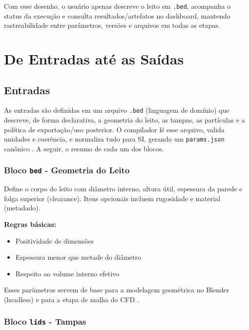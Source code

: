Com esse desenho, o usuário apenas descreve o leito em \texttt{.bed}, acompanha o status da execução e consulta resultados/artefatos no dashboard, mantendo rastreabilidade entre parâmetros, versões e arquivos em todas as etapas.

\section{De Entradas até as Saídas}

\subsection{Entradas}

As entradas são definidas em um arquivo \texttt{.bed} (linguagem de domínio) que descreve, de forma declarativa, a geometria do leito, as tampas, as partículas e a política de exportação/uso posterior. O compilador lê esse arquivo, valida unidades e coerência, e normaliza tudo para SI, gerando um \texttt{params.json} canônico \cite{fowler2010}. A seguir, o resumo de cada um dos blocos.

\subsubsection{Bloco \texttt{bed} - Geometria do Leito}

Define o corpo do leito com diâmetro interno, altura útil, espessura da parede e folga superior (clearance). Itens opcionais incluem rugosidade e material (metadado). 

\textbf{Regras básicas:}
\begin{itemize}
    \item Positividade de dimensões
    \item Espessura menor que metade do diâmetro
    \item Respeito ao volume interno efetivo
\end{itemize}

Esses parâmetros servem de base para a modelagem geométrica no Blender (headless) e para a etapa de malha do CFD \cite{blender2021, openfoam2023}.

\subsubsection{Bloco \texttt{lids} - Tampas}

